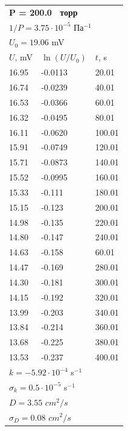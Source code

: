 \documentclass[a4paper,12pt]{article}
\begin{document}
	
	\newpage
	
	\begin{center}
		
		
		\begin{tabular}{||l|l|l||}
			\hline
			
			
			
			\multicolumn{3}{||l||}{\textbf{P = 200.0  торр}} \\ 
			\multicolumn{3}{||l||}{$1 / P = 3.75\cdot 10^{-5}$ $Па^{-1}$} \\ \hline
			\multicolumn{3}{||l||}{$U_0 = 19.06$ mV} \\ \hline
			$U$, mV&$\ln (U/U_0)$ & $t$, s \\ \hline
			16.95& -0.0113 &20.01 \\ \hline
			16.74 &  -0.0239 &40.01 \\ \hline
			16.53 & -0.0366&60.01  \\ \hline
			16.32 & -0.0495 &80.01  \\ \hline
			16.11 & -0.0620&100.01  \\ \hline
			15.91  & -0.0749&120.01  \\ \hline
			15.71& 	-0.0873&140.01  \\ \hline
			15.52& -0.0995&160.01  \\ \hline
			15.33& -0.111 &180.01  \\ \hline
			15.15& -0.123 &200.01  \\ \hline
			14.98& -0.135  &220.01  \\ \hline
			14.80& -0.147 &240.01 \\ \hline
			14.63& -0.158 &60.01\\ \hline
			14.47& -0.169 &280.01  \\ \hline
			14.30& -0.181  &300.01  \\ \hline
			14.15&-0.192& 320.01  \\ \hline
			13.99& -0.203&340.01  \\ \hline
			13.84&-0.214& 360.01  \\ \hline
			13.68& 	-0.225 &380.01  \\ \hline
			13.53& -0.237&400.01  \\ \hline
			\multicolumn{3}{||l||}{$k = -5.92\cdot 10^{-4}$ s$^{-1}$} \\ 
			\multicolumn{3}{||l||}{$\sigma_k =0.5 \cdot 10^{-5}$ s$^{-1}$} \\ \hline 
			\multicolumn{3}{||l||}{$D = 3.55$ $cm^2/s$}\\ 
			\multicolumn{3}{||l||}{$\sigma_D =0.08$ $cm^2/s$} \\ \hline 
		\end{tabular}\begin{tabular}{||l|l|l||}
			\hline
			

\end{tabular}
\end{center}
\end{document}
